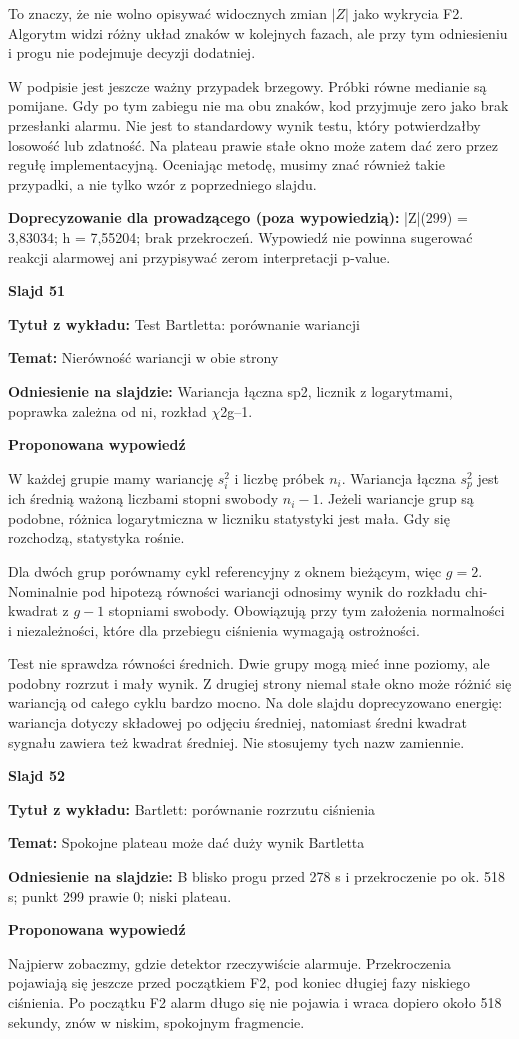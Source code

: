 \documentclass[a4paper,11pt]{article}
\newcommand{\NumerSlajdu}{1}
\newcommand{\Komentarz}[3]{%
  \gdef\NumerSlajdu{#1}%
  {\Large\bfseries Slajd #1\par}\smallskip
  \textbf{Tytuł z wykładu:} #2\par
  \textbf{Temat:} #3\par\medskip
}
\begin{document}
To znaczy, że nie wolno opisywać widocznych zmian $|Z|$ jako wykrycia F2. Algorytm widzi różny układ znaków w kolejnych fazach, ale przy tym odniesieniu i progu nie podejmuje decyzji dodatniej.

W podpisie jest jeszcze ważny przypadek brzegowy. Próbki równe medianie są pomijane. Gdy po tym zabiegu nie ma obu znaków, kod przyjmuje zero jako brak przesłanki alarmu. Nie jest to standardowy wynik testu, który potwierdzałby losowość lub zdatność. Na plateau prawie stałe okno może zatem dać zero przez regułę implementacyjną. Oceniając metodę, musimy znać również takie przypadki, a nie tylko wzór z poprzedniego slajdu.

{\small\color{black!65}\textbf{Doprecyzowanie dla prowadzącego (poza wypowiedzią):} |Z|(299) = 3,83034; h = 7,55204; brak przekroczeń. Wypowiedź nie powinna sugerować reakcji alarmowej ani przypisywać zerom interpretacji p-value.\par}
\clearpage

\Komentarz{51}{Test Bartletta: porównanie wariancji}{Nierówność wariancji w obie strony}
{\small\color{black!65}\textbf{Odniesienie na slajdzie:} Wariancja łączna sp2, licznik z logarytmami, poprawka zależna od ni, rozkład \ensuremath{\chi}2g--1.\par}
\medskip
\textbf{Proponowana wypowiedź}\par
W każdej grupie mamy wariancję $s_i^2$ i liczbę próbek $n_i$. Wariancja łączna $s_p^2$ jest ich średnią ważoną liczbami stopni swobody $n_i-1$. Jeżeli wariancje grup są podobne, różnica logarytmiczna w liczniku statystyki jest mała. Gdy się rozchodzą, statystyka rośnie.

Dla dwóch grup porównamy cykl referencyjny z oknem bieżącym, więc $g=2$. Nominalnie pod hipotezą równości wariancji odnosimy wynik do rozkładu chi-kwadrat z $g-1$ stopniami swobody. Obowiązują przy tym założenia normalności i niezależności, które dla przebiegu ciśnienia wymagają ostrożności.

Test nie sprawdza równości średnich. Dwie grupy mogą mieć inne poziomy, ale podobny rozrzut i mały wynik. Z drugiej strony niemal stałe okno może różnić się wariancją od całego cyklu bardzo mocno. Na dole slajdu doprecyzowano energię: wariancja dotyczy składowej po odjęciu średniej, natomiast średni kwadrat sygnału zawiera też kwadrat średniej. Nie stosujemy tych nazw zamiennie.
\clearpage

\Komentarz{52}{Bartlett: porównanie rozrzutu ciśnienia}{Spokojne plateau może dać duży wynik Bartletta}
{\small\color{black!65}\textbf{Odniesienie na slajdzie:} B blisko progu przed 278 s i przekroczenie po ok. 518 s; punkt 299 prawie 0; niski plateau.\par}
\medskip
\textbf{Proponowana wypowiedź}\par
Najpierw zobaczmy, gdzie detektor rzeczywiście alarmuje. Przekroczenia pojawiają się jeszcze przed początkiem F2, pod koniec długiej fazy niskiego ciśnienia. Po początku F2 alarm długo się nie pojawia i wraca dopiero około 518 sekundy, znów w niskim, spokojnym fragmencie.
\end{document}
